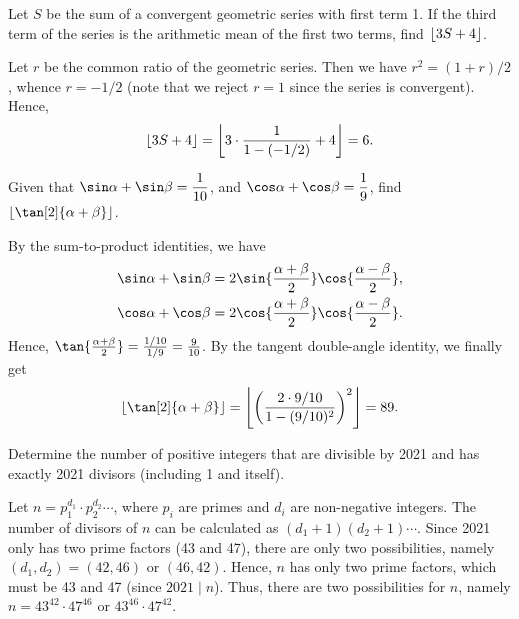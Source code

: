 \begin{question}[6]\label{Q::2021-O-1-11}
    Let $S$ be the sum of a convergent geometric series with first term 1. If the third term of the series is the arithmetic mean of the first two terms, find $\left\lfloor 3S + 4 \right\rfloor$.
\end{question}
\begin{solution*}
    Let $r$ be the common ratio of the geometric series. Then we have $r^2 = (1+r)/2$, whence $r = -1/2$ (note that we reject $r = 1$ since the series is convergent). Hence, \[\left\lfloor 3S + 4 \right\rfloor = \left\lfloor 3 \cdot \frac{1}{1 - (-1/2)} + 4 \right\rfloor = 6.\]
\end{solution*}

\begin{question}[89]\label{Q::2021-O-1-12}
    Given that $\sin \a + \sin \b = \dfrac1{10}$, and $\cos \a + \cos \b = \dfrac19$, find $\floor{\tan[2]{\a + \b}}$.
\end{question}
\begin{solution*}
    By the sum-to-product identities, we have 
    \begin{align*}
        \sin \a + \sin \b &= 2\sin{\frac{\a+\b}{2}}\cos{\frac{\a - \b}{2}},\\
        \cos \a + \cos \b &= 2\cos{\frac{\a+\b}{2}}\cos{\frac{\a-\b}{2}}.
    \end{align*}
    Hence, $\tan{\frac{\a+\b}{2}} = \frac{1/10}{1/9} = \frac9{10}$. By the tangent double-angle identity, we finally get \[\floor{\tan[2]{\a + \b}} = \floor{\bp{\frac{2 \cdot 9/10}{1 - (9/10)^2}}^2} = 89.\]
\end{solution*}

\begin{question}[2]\label{Q::2021-O-1-13}
    Determine the number of positive integers that are divisible by 2021 and has exactly 2021 divisors (including 1 and itself).
\end{question}
\begin{solution*}
    Let $n = p_1^{d_1} \cdot p_2^{d_2} \cdots$, where $p_i$ are primes and $d_i$ are non-negative integers. The number of divisors of $n$ can be calculated as $(d_1 + 1)(d_2 + 1)\cdots$. Since 2021 only has two prime factors (43 and 47), there are only two possibilities, namely $(d_1, d_2) = (42, 46)$ or $(46, 42)$. Hence, $n$ has only two prime factors, which must be 43 and 47 (since $2021 \mid n$). Thus, there are two possibilities for $n$, namely $n = 43^{42} \cdot 47^{46}$ or $43^{46} \cdot 47^{42}$.
\end{solution*}

